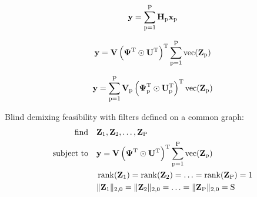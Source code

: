\documentclass{article}
\newcommand{\numSources}{\text{P}}
\newcommand{\sourceIndex}{\text{p}}
\DeclareMathOperator*{\vect}{vec}
\DeclareMathOperator*{\rank}{rank}
\begin{document}
\begin{equation}
  \bby = \sum_{\sourceIndex=1}^{\numSources} \bbH_{\sourceIndex} \bbx_{\sourceIndex}
\end{equation}

\begin{equation}
  \bby = \bbV \left(\bbPsi^{\rmT} \odot \bbU^{\rmT} \right)^{\rmT}\sum_{\sourceIndex=1}^{\numSources} \vect(\bbZ_{\sourceIndex})
\end{equation}

\begin{equation}
  \bby = \sum_{\sourceIndex=1}^{\numSources} \bbV_{\sourceIndex} \left(\bbPsi_{\sourceIndex}^{\rmT} \odot \bbU_{\sourceIndex}^{\rmT} \right)^{\rmT} \vect(\bbZ_{\sourceIndex})
\end{equation}

Blind demixing feasibility with filters defined on a common graph:
\begin{align}
  \mathop{\text{find}} \quad & \bbZ_{1}, \bbZ_{2}, \ldots, \bbZ_{\numSources} \\
  \text{subject to} \quad & \bby = \bbV \left(\bbPsi^{\rmT} \odot \bbU^{\rmT} \right)^{\rmT}\sum_{\sourceIndex=1}^{\numSources} \vect(\bbZ_{\sourceIndex}) \nonumber \\
  & \rank(\bbZ_{1}) = \rank(\bbZ_{2}) = \ldots = \rank(\bbZ_{\numSources}) = 1 \nonumber \\
  & \|\bbZ_{1}\|_{2,0} = \|\bbZ_{2}\|_{2,0} = \ldots = \|\bbZ_{\numSources}\|_{2,0} = \rmS \nonumber
\end{align}
\end{document}
